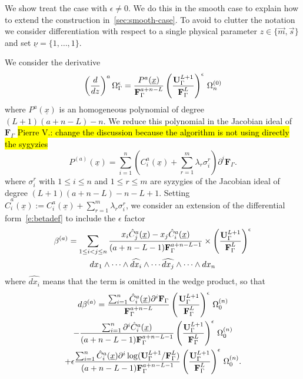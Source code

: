 \documentclass[a4paper,12pt]{article}
\numberwithin{equation}{section}
\numberwithin{figure}{subsection}
\theoremstyle{plain}
\theoremstyle{plain}
\theoremstyle{definition}
\theoremstyle{plain}
\theoremstyle{remark}
\theoremstyle{plain}
\newcommand{\pvnote}[1]{\sethlcolor{bubblegum} \protect\hl{Pierre V.: #1} \sethlcolor{yellow}}
\begin{document}
We show treat the  case with $\epsilon\neq0$. We do this in the smooth
case to explain how to extend the construction
in~\ref{sec:smooth-case}.  To avoid to clutter the
notation we consider differentiation with respect to a single physical
parameter $z\in\{\vec m,\vec s\}$ and set $\underline
\nu=\{1,\dots,1\}$. 


We consider the derivative  
\begin{equation}
 \left(d\over dz\right)^a
 \Omega_\Gamma^\epsilon={P^a(\underline x)\over
   \textbf{F}_\Gamma^{a+n-L}} \left(\textbf{U}_\Gamma^{L+1}\over
   \textbf{F}_\Gamma^L \right)^\epsilon\,\Omega_n^{(0)}
\end{equation}
where $P^a(\underline x)$ is an homogeneous polynomial of degree $(L+1)(a+n-L)-n$.
%
We reduce this polynomial in the Jacobian ideal of  $
\textbf{F}_\Gamma$ \pvnote{change the discussion because the algorithm
  is not using directly the sygyzies}
\begin{equation}\label{e:GDPsyz}
  P^{(a)}(\underline x)= \sum_{i=1}^n \left( C^a_i(\underline
  x)+\sum_{r=1}^m \lambda_r\sigma_i^r \right)\partial^i \textbf{F}_\Gamma.
\end{equation}
where $\sigma_i^r $ with $1\leq i\leq n$ and $1\leq r\leq m$ are
syzygies of the Jacobian ideal of degree $(L+1)(a+n-L)-n-L+1$.
Setting $\hat C_i^a(\underline x):= C^a_i(\underline
  x)+\sum_{r=1}^m \lambda_r\sigma_i^r $,
we consider an extension of the differential form~\eqref{e:betadef} to
include the $\epsilon$ factor
   \begin{multline}\label{e:betadefepsilon}
  \beta^{(a)}=   \sum_{1\leq i<j\leq n} {x_i
    \hat C^{a}_j  (\underline x)-x_j
    \hat C^{a}_i(\underline x)\over (a+n-L-1)\textbf{F}_\Gamma^{a+n-L-1}}\times \left(\textbf{U}_\Gamma^{L+1}\over
   \textbf{F}_\Gamma^L \right)^\epsilon\cr
dx_1\wedge \cdots \wedge \widehat{dx_i}\wedge \cdots \widehat{dx_j}\wedge
  \cdots \wedge dx_n
   \end{multline}
where $\widehat{dx_i}$ means that the term is omitted in the wedge
product,   so that
   \begin{multline}
     d\beta^{(a)}= {    \sum_{i=1}^n  \hat C^{a}_i
     (\underline x)
     \partial^i \textbf{F}_\Gamma\over
     \textbf{F}_\Gamma^{a+n-L}}\left(\textbf{U}_\Gamma^{L+1}\over
   \textbf{F}_\Gamma^L \right)^\epsilon\,\Omega_0^{(n)}\cr- {
     \sum_{i=1}^n  \partial ^i \hat C^{a}_i
     (\underline x)
    \over  (a+n-L-1)  \textbf{F}_\Gamma^{a+n-L-1}}\left(\textbf{U}_\Gamma^{L+1}\over
    \textbf{F}_\Gamma^L \right)^\epsilon\, \Omega_0^{(n)}\cr
  +\epsilon {
     \sum_{i=1}^n  \hat C^{a}_i
     (\underline x) \partial ^i \log(\textbf{U}_\Gamma^{L+1}/
    \textbf{F}_\Gamma^L )
    \over  (a+n-L-1)
    \textbf{F}_\Gamma^{a+n-L-1}}\left(\textbf{U}_\Gamma^{L+1}\over 
    \textbf{F}_\Gamma^L \right)^\epsilon\, \Omega_0^{(n)}.
   \end{multline}
\end{document}
